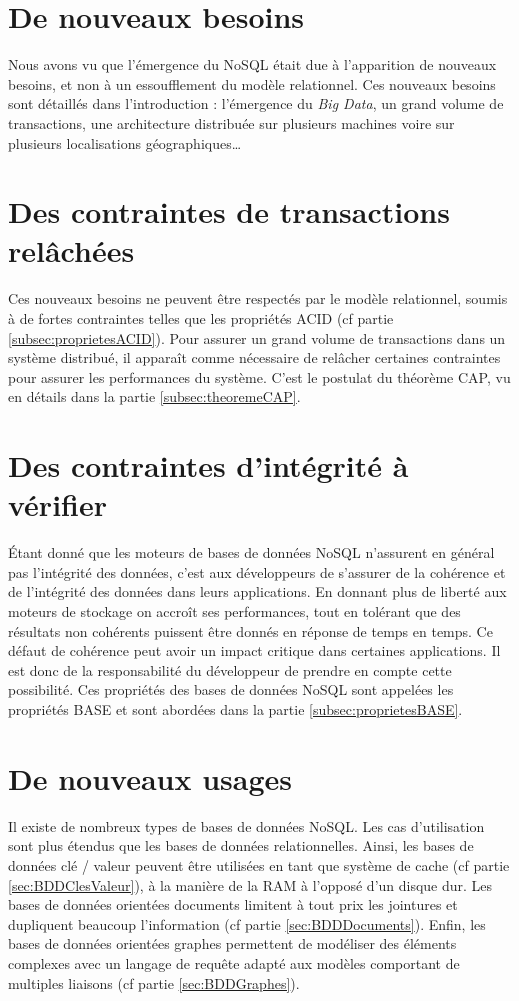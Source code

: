 \section*{De nouveaux besoins}
	Nous avons vu que l'émergence du NoSQL était due à l'apparition de nouveaux besoins, et non à un essoufflement du modèle relationnel. Ces nouveaux besoins sont détaillés dans l'introduction : l'émergence du \textit{Big Data}, un grand volume de transactions, une architecture distribuée sur plusieurs machines voire sur plusieurs localisations géographiques\dots

\section*{Des contraintes de transactions relâchées}
	Ces nouveaux besoins ne peuvent être respectés par le modèle relationnel, soumis à de fortes contraintes telles que les propriétés ACID (cf partie \ref{subsec:proprietesACID}). Pour assurer un grand volume de transactions dans un système distribué, il apparaît comme nécessaire de relâcher certaines contraintes pour assurer les performances du système. C'est le postulat du théorème CAP, vu en détails dans la partie \ref{subsec:theoremeCAP}.

\section*{Des contraintes d'intégrité à vérifier}
	Étant donné que les moteurs de bases de données NoSQL n'assurent en général pas l'intégrité des données, c'est aux développeurs de s'assurer de la cohérence et de l'intégrité des données dans leurs applications. En donnant plus de liberté aux moteurs de stockage on accroît ses performances, tout en tolérant que des résultats non cohérents puissent être donnés en réponse de temps en temps. Ce défaut de cohérence peut avoir un impact critique dans certaines applications. Il est donc de la responsabilité du développeur de prendre en compte cette possibilité. Ces propriétés des bases de données NoSQL sont appelées les propriétés BASE et sont abordées dans la partie \ref{subsec:proprietesBASE}.

\section*{De nouveaux usages}
	Il existe de nombreux types de bases de données NoSQL. Les cas d'utilisation sont plus étendus que les bases de données relationnelles. Ainsi, les bases de données clé / valeur peuvent être utilisées en tant que système de cache (cf partie \ref{sec:BDDClesValeur}), à la manière de la RAM à l'opposé d'un disque dur. Les bases de données orientées documents limitent à tout prix les jointures et dupliquent beaucoup l'information (cf partie \ref{sec:BDDDocuments}). Enfin, les bases de données orientées graphes permettent de modéliser des éléments complexes avec un langage de requête adapté aux modèles comportant de multiples liaisons (cf partie \ref{sec:BDDGraphes}).